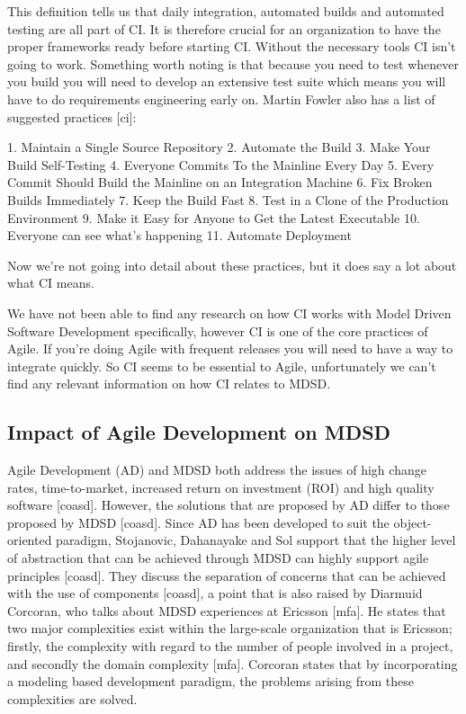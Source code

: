 \documentclass[fina_report_innit.tex]{subfiles}
\begin{document}
This definition tells us that daily integration, automated builds and automated testing are all part of CI. It is therefore crucial for an organization to have the proper frameworks ready before starting CI. Without the necessary tools CI isn’t going to work. Something worth noting is that because you need to test whenever you build you will need to develop an extensive test suite which means you will have to do requirements engineering early on. Martin Fowler also has a list of suggested practices [ci]: 

1.	Maintain a Single Source Repository
2.	Automate the Build
3.	Make Your Build Self-Testing
4.	Everyone Commits To the Mainline Every Day
5.	Every Commit Should Build the Mainline on an Integration Machine
6.	Fix Broken Builds Immediately
7.	Keep the Build Fast
8.	Test in a Clone of the Production Environment
9.	Make it Easy for Anyone to Get the Latest Executable
10.	Everyone can see what's happening
11.	Automate Deployment

Now we’re not going into detail about these practices, but it does say a lot about what CI means. 

We have not been able to find any research on how CI works with Model Driven Software Development specifically, however CI is one of the core practices of Agile. If you’re doing Agile with frequent releases you will need to have a way to integrate quickly. So CI seems to be essential to Agile, unfortunately we can’t find any relevant information on how CI relates to MDSD.

\subsection*{Impact of Agile Development on MDSD}

Agile Development (AD) and MDSD both address the issues of high change rates, time-to-market, increased return on investment (ROI) and high quality software [coasd]. However, the solutions that are proposed by AD differ to those proposed by MDSD [coasd]. Since AD has been developed to suit the object-oriented paradigm, Stojanovic, Dahanayake and Sol support that the higher level of abstraction that can be achieved through MDSD can highly support agile principles [coasd]. They discuss the separation of concerns that can be achieved with the use of components [coasd], a point that is also raised by Diarmuid Corcoran, who talks about MDSD experiences at Ericsson [mfa]. He states that two major complexities exist within the large-scale organization that is Ericsson; firstly, the complexity with regard to the number of people involved in a project, and secondly the domain complexity [mfa]. Corcoran states that by incorporating a modeling based development paradigm, the problems arising from these complexities are solved. 
\end{document}
